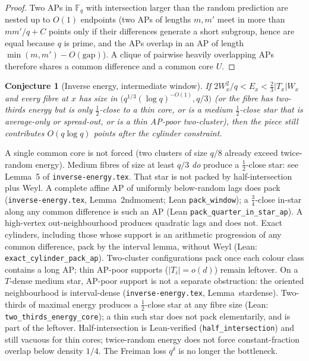 \documentclass[11pt]{article}
\newtheorem{conjecture}[theorem]{Conjecture}
\theoremstyle{definition}
\newcommand{\F}{\mathbb{F}}
\begin{document}
\begin{proof}
Two APs in $\F_q$ with intersection larger than the random prediction are nested up to $O(1)$ endpoints (two APs of lengths $m,m'$ meet in more than $mm'/q+C$ points only if their differences generate a short subgroup, hence are equal because $q$ is prime, and the APs overlap in an AP of length $\min(m,m')-O(\mathrm{gap})$).
A clique of pairwise heavily overlapping APs therefore shares a common difference and a common core $U$.
\end{proof}

\begin{conjecture}[Inverse energy, intermediate window]\label{lem:inverse}
If $2W_x^{2}/q<E_x<\tfrac23|T_x|W_x$ and every fibre at $x$ has size in $\bigl(q^{1/3}(\log q)^{-O(1)},q/3\bigr)$
(or the fibre has two-thirds energy but is only $\tfrac12$-close to a thin core,
or is a medium $\tfrac12$-close star that is average-only or spread-out,
or is a thin AP-poor two-cluster),
then the piece still contributes $O(q\log q)$ points after the cylinder constraint.
\end{conjecture}

A single common core is not forced (two clusters of size $q/8$ already exceed twice-random energy).
Medium fibres of size at least $q/3$ \emph{do} produce a $\tfrac12$-close star:
see Lemma~5 of \texttt{inverse-energy.tex}.
That star is not packed by half-intersection plus Weyl.
A complete affine AP of uniformly below-random lags does pack
(\texttt{inverse-energy.tex}, Lemma~2ndmoment; Lean
\texttt{pack\_window}); a $\tfrac34$-close in-star along any common
difference is such an AP (Lean \texttt{pack\_quarter\_in\_star\_ap}).
A high-vertex out-neighbourhood produces quadratic lags and does not.
Exact cylinders, including those whose support is an arithmetic progression
of any common difference, pack by the interval lemma, without Weyl
(Lean: \texttt{exact\_cylinder\_pack\_ap}).
Two-cluster configurations pack once each colour class contains a long AP;
thin AP-poor supports ($|T_i|=o(d)$) remain leftover.
On a $T$-dense medium star, AP-poor support is not a separate
obstruction: the oriented neighbourhood is interval-dense
(\texttt{inverse-energy.tex}, Lemma~stardense).
Two-thirds of maximal energy produces a $\tfrac12$-close star at any fibre
size (Lean: \texttt{two\_thirds\_energy\_core}); a thin such star does not
pack elementarily, and is part of the leftover.
Half-intersection is Lean-verified (\texttt{half\_intersection}) and still
vacuous for thin cores; twice-random energy does not force constant-fraction overlap below density $1/4$.
The Freiman loss $q^{\delta}$ is no longer the bottleneck.
\end{document}
